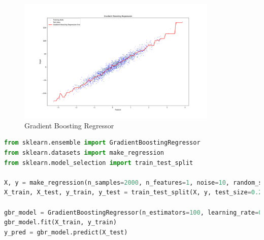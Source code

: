 \begin{figure}[H]
	\centering
	\includegraphics[width=0.85\textwidth]{./Images/Gradient-Boosting-Regression.png}
	\caption{Gradient Boosting Regressor}
	\label{fig:gradient-boosting-regressor}
\end{figure}

\begin{lstlisting}[language=Python, caption=Gradient Boosting Regressor Example]
from sklearn.ensemble import GradientBoostingRegressor
from sklearn.datasets import make_regression
from sklearn.model_selection import train_test_split

X, y = make_regression(n_samples=2000, n_features=1, noise=10, random_state=42)
X_train, X_test, y_train, y_test = train_test_split(X, y, test_size=0.2, random_state=42)

gbr_model = GradientBoostingRegressor(n_estimators=100, learning_rate=0.1, max_depth=3, random_state=42)
gbr_model.fit(X_train, y_train)
y_pred = gbr_model.predict(X_test)
\end{lstlisting}
